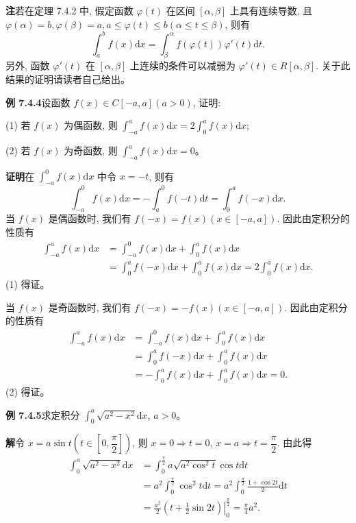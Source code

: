 \documentclass[UTF8,12pt,a4paper,fontset=fandol]{ctexart}
\begin{document}
\noindent\textbf{注}\quad 若在定理 7.4.2 中, 假定函数 $\varphi(t)$ 在区间 $[\alpha,\beta]$ 上具有连续导数, 且 $\varphi(\alpha)=b,\varphi(\beta)=a,a\leq\varphi(t)\leq b(\alpha\leq t\leq\beta)$, 则有
\[
  \int_a^b f(x)\mathrm dx=\int_\beta^\alpha f(\varphi(t))\varphi'(t)\mathrm dt.
\]
另外, 函数 $\varphi'(t)$ 在 $[\alpha,\beta]$ 上连续的条件可以减弱为 $\varphi'(t)\in R[\alpha,\beta]$. 关于此结果的证明请读者自己给出。

\noindent\textbf{例 7.4.4}\quad 设函数 $f(x)\in C[-a,a](a>0)$, 证明:

(1) 若 $f(x)$ 为偶函数, 则 $\int_{-a}^a f(x)\mathrm dx=2\int_0^a f(x)\mathrm dx$;

(2) 若 $f(x)$ 为奇函数, 则 $\int_{-a}^a f(x)\mathrm dx=0$。

\noindent\textbf{证明}\quad 在 $\int_{-a}^0 f(x)\mathrm dx$ 中令 $x=-t$, 则有
\[
  \int_{-a}^0 f(x)\mathrm dx=-\int_a^0 f(-t)\mathrm dt=\int_0^a f(-x)\mathrm dx.
\]
当 $f(x)$ 是偶函数时, 我们有 $f(-x)=f(x)(x\in[-a,a])$. 因此由定积分的性质有
\[
\begin{aligned}
  \int_{-a}^a f(x)\mathrm dx
  &=\int_{-a}^0 f(x)\mathrm dx+\int_0^a f(x)\mathrm dx\\
  &=\int_0^a f(-x)\mathrm dx+\int_0^a f(x)\mathrm dx
  =2\int_0^a f(x)\mathrm dx.
\end{aligned}
\]
(1) 得证。

当 $f(x)$ 是奇函数时, 我们有 $f(-x)=-f(x)(x\in[-a,a])$. 因此由定积分的性质有
\[
\begin{aligned}
  \int_{-a}^a f(x)\mathrm dx
  &=\int_{-a}^0 f(x)\mathrm dx+\int_0^a f(x)\mathrm dx\\
  &=\int_0^a f(-x)\mathrm dx+\int_0^a f(x)\mathrm dx\\
  &=-\int_0^a f(x)\mathrm dx+\int_0^a f(x)\mathrm dx=0.
\end{aligned}
\]
(2) 得证。

\noindent\textbf{例 7.4.5}\quad 求定积分 $\int_0^a \sqrt{a^2-x^2}\mathrm dx$, $a>0$。

\noindent\textbf{解}\quad 令 $x=a\sin t\left(t\in\left[0,\dfrac{\pi}{2}\right]\right)$, 则 $x=0\Rightarrow t=0$, $x=a\Rightarrow t=\dfrac{\pi}{2}$. 由此得
\[
\begin{aligned}
  \int_0^a \sqrt{a^2-x^2}\mathrm dx
  &=\int_0^{\frac{\pi}{2}} a\sqrt{a^2\cos^2 t}\cos t\mathrm dt\\
  &=a^2\int_0^{\frac{\pi}{2}}\cos^2 t\mathrm dt
  =a^2\int_0^{\frac{\pi}{2}}\frac{1+\cos 2t}{2}\mathrm dt\\
  &=\frac{a^2}{2}\left.\left(t+\frac{1}{2}\sin 2t\right)\right|_0^{\frac{\pi}{2}}
  =\frac{\pi}{4}a^2.
\end{aligned}
\]
\end{document}
